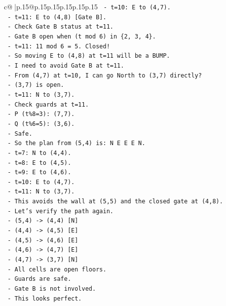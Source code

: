 \documentclass{article}
\begin{document}
{\begin{supertabular}{c@{$\;$}|p{.15\linewidth}@{}p{.15\linewidth}p{.15\linewidth}p{.15\linewidth}p{.15\linewidth}p{.15\linewidth}}
{{{\texttt{  {-} t=10: E to (4,7).} \\
\texttt{  {-} t=11: E to (4,8) {[}Gate B{]}.} \\
\texttt{  {-} Check Gate B status at t=11.} \\
\texttt{  {-} Gate B open when (t mod 6) in \{2, 3, 4\}.} \\
\texttt{  {-} t=11: 11 mod 6 = 5. Closed!} \\
\texttt{  {-} So moving E to (4,8) at t=11 will be a BUMP.} \\
\texttt{  {-} I need to avoid Gate B at t=11.} \\
\texttt{  {-} From (4,7) at t=10, I can go North to (3,7) directly?} \\
\texttt{  {-} (3,7) is open.} \\
\texttt{  {-} t=11: N to (3,7).} \\
\texttt{  {-} Check guards at t=11.} \\
\texttt{  {-} P (t\%8=3): (7,7).} \\
\texttt{  {-} Q (t\%6=5): (3,6).} \\
\texttt{  {-} Safe.} \\
\texttt{  {-} So the plan from (5,4) is: N E E E N.} \\
\texttt{  {-} t=7: N to (4,4).} \\
\texttt{  {-} t=8: E to (4,5).} \\
\texttt{  {-} t=9: E to (4,6).} \\
\texttt{  {-} t=10: E to (4,7).} \\
\texttt{  {-} t=11: N to (3,7).} \\
\texttt{  {-} This avoids the wall at (5,5) and the closed gate at (4,8).} \\
\texttt{  {-} Let's verify the path again.} \\
\texttt{  {-} (5,4) {-}> (4,4) {[}N{]}} \\
\texttt{  {-} (4,4) {-}> (4,5) {[}E{]}} \\
\texttt{  {-} (4,5) {-}> (4,6) {[}E{]}} \\
\texttt{  {-} (4,6) {-}> (4,7) {[}E{]}} \\
\texttt{  {-} (4,7) {-}> (3,7) {[}N{]}} \\
\texttt{  {-} All cells are open floors.} \\
\texttt{  {-} Guards are safe.} \\
\texttt{  {-} Gate B is not involved.} \\
\texttt{  {-} This looks perfect.} \\
}}}
\end{supertabular}}
\end{document}
